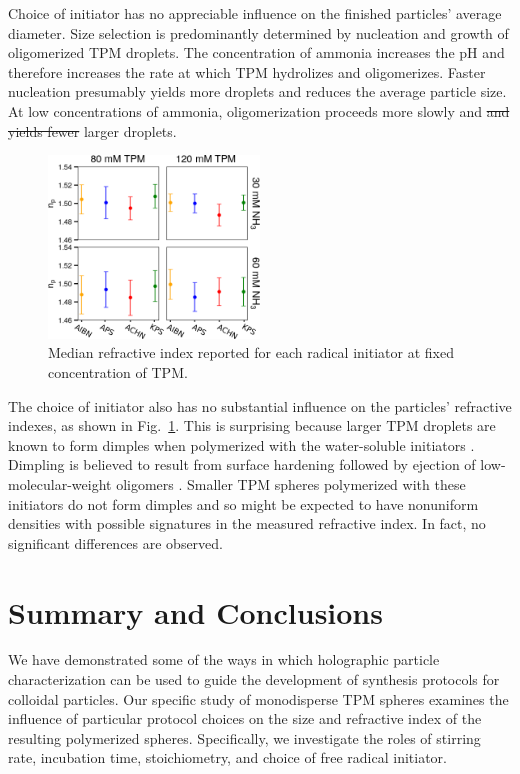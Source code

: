\documentclass[journal=langd5,manuscript=article]{achemso}
\providecommand{\DIFadd}[1]{{\protect\color{blue}\uwave{#1}}} %
\providecommand{\DIFdel}[1]{{\protect\color{red}\sout{#1}}}                      %
\providecommand{\DIFaddbegin}{} %
\providecommand{\DIFaddend}{} %
\providecommand{\DIFdelbegin}{} %
\providecommand{\DIFdelend}{} %
\begin{document}
Choice of initiator has no appreciable 
influence on the finished particles'
average diameter.
Size selection is predominantly 
determined by nucleation and growth of
oligomerized TPM droplets.
The concentration of ammonia increases the pH and
therefore increases the rate at which TPM hydrolizes and oligomerizes.
Faster nucleation
presumably yields more droplets and reduces the average particle size.
At low concentrations of ammonia, 
oligomerization proceeds more slowly
and \DIFdelbegin \DIFdel{and yields fewer }\DIFdelend \DIFaddbegin \DIFadd{yields fewer of the }\DIFaddend larger droplets.

\begin{figure}
    \centering
    \includegraphics[width=0.5\textwidth]{longitudinal_np_02}
    \caption{Median refractive index reported for each radical initiator
    at fixed concentration of TPM.}
    \label{fig:longitudinal_np}
\end{figure}

The choice of initiator also has no substantial
influence on the particles' refractive indexes,
as shown in Fig.~\ref{fig:longitudinal_np}.
This is surprising because
larger TPM droplets are known to form dimples when polymerized
with the water-soluble initiators \cite{sacanna11}.
Dimpling is believed to result from
surface hardening followed by
ejection of low-molecular-weight oligomers \cite{sacanna11}.
Smaller TPM spheres polymerized with these
initiators do not form dimples and so might 
be expected to have nonuniform densities
with possible signatures in the measured refractive
index.  In fact, no significant differences are observed.

\section{Summary and Conclusions}
\label{sec:discussion}

We have demonstrated some of the ways in which 
holographic particle characterization
can be used to guide the development of synthesis
protocols for colloidal particles.
Our specific study of monodisperse TPM spheres
examines the influence of particular protocol
choices on the size and refractive index of 
the resulting polymerized spheres. Specifically,
we investigate the roles of stirring rate, 
incubation time, stoichiometry, and choice of
free radical initiator.
\end{document}
